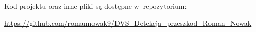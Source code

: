 \documentclass[11pt]{aghdpl}
\author{Roman Nowak}
\date{2025}
\begin{document}
    \titlepages
    {
    	\fancyhf{}
    	\renewcommand{\headrulewidth}{0pt}
    	\renewcommand{\footrulewidth}{0pt}
    }

    
    \setcounter{tocdepth}{2}
    \tableofcontents
    \clearpage
    
    
    
    
        
        
        
        
        
    
    
    \printbibliography

    Kod projektu oraz inne pliki są dostępne w~repozytorium: 
    
    \url{https://github.com/romannowak9/DVS_Detekcja_przeszkod_Roman_Nowak}
\end{document}
